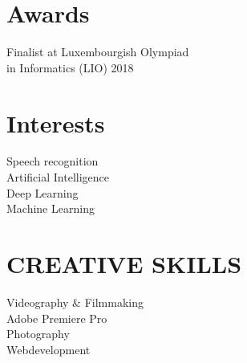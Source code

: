 \documentclass[]{curriculumvitae}
\begin{document}
\begin{minipage}[t]{0.34\textwidth}
\section{Awards}
Finalist at Luxembourgish Olympiad\\
in Informatics (LIO) 2018
\sectionsep

\section{Interests}
Speech recognition\\
Artificial Intelligence\\
Deep Learning\\
Machine Learning
\sectionsep

\section{CREATIVE SKILLS}
Videography \& Filmmaking\\
Adobe Premiere Pro\\
Photography\\
Webdevelopment
\sectionsep


\end{minipage} 
\hfill
\end{document}
